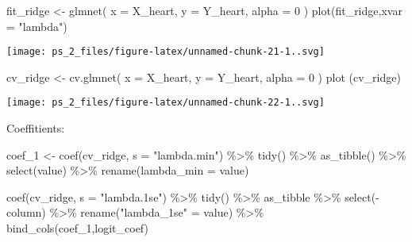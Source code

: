 \documentclass[
]{article}
\newenvironment{Shaded}{\begin{snugshade}}{\end{snugshade}}
\newcommand{\AttributeTok}[1]{\textcolor[rgb]{0.77,0.63,0.00}{#1}}
\newcommand{\DecValTok}[1]{\textcolor[rgb]{0.00,0.00,0.81}{#1}}
\newcommand{\FunctionTok}[1]{\textcolor[rgb]{0.00,0.00,0.00}{#1}}
\newcommand{\NormalTok}[1]{#1}
\newcommand{\OtherTok}[1]{\textcolor[rgb]{0.56,0.35,0.01}{#1}}
\newcommand{\SpecialCharTok}[1]{\textcolor[rgb]{0.00,0.00,0.00}{#1}}
\newcommand{\StringTok}[1]{\textcolor[rgb]{0.31,0.60,0.02}{#1}}
\begin{document}
\begin{Shaded}
\begin{Highlighting}[]
\NormalTok{fit\_ridge }\OtherTok{\textless{}{-}} \FunctionTok{glmnet}\NormalTok{(}
  \AttributeTok{x =}\NormalTok{ X\_heart,}
  \AttributeTok{y =}\NormalTok{ Y\_heart,}
  \AttributeTok{alpha =} \DecValTok{0}
\NormalTok{)}
\FunctionTok{plot}\NormalTok{(fit\_ridge,}\AttributeTok{xvar =} \StringTok{"lambda"}\NormalTok{)}
\end{Highlighting}
\end{Shaded}

\texttt{[image: ps\_2\_files/figure-latex/unnamed-chunk-21-1..svg]}

\begin{Shaded}
\begin{Highlighting}[]
\NormalTok{cv\_ridge }\OtherTok{\textless{}{-}} \FunctionTok{cv.glmnet}\NormalTok{(}
  \AttributeTok{x =}\NormalTok{ X\_heart,}
  \AttributeTok{y =}\NormalTok{ Y\_heart,}
  \AttributeTok{alpha =} \DecValTok{0} 
\NormalTok{)}
\FunctionTok{plot}\NormalTok{ (cv\_ridge)}
\end{Highlighting}
\end{Shaded}

\texttt{[image: ps\_2\_files/figure-latex/unnamed-chunk-22-1..svg]}

Coeffitients:

\begin{Shaded}
\begin{Highlighting}[]
\NormalTok{coef\_1 }\OtherTok{\textless{}{-}} \FunctionTok{coef}\NormalTok{(cv\_ridge, }\AttributeTok{s =} \StringTok{"lambda.min"}\NormalTok{) }\SpecialCharTok{\%\textgreater{}\%}
  \FunctionTok{tidy}\NormalTok{() }\SpecialCharTok{\%\textgreater{}\%}
  \FunctionTok{as\_tibble}\NormalTok{() }\SpecialCharTok{\%\textgreater{}\%}
  \FunctionTok{select}\NormalTok{(value) }\SpecialCharTok{\%\textgreater{}\%}
  \FunctionTok{rename}\NormalTok{(}\AttributeTok{lambda\_min =}\NormalTok{ value)}

\FunctionTok{coef}\NormalTok{(cv\_ridge, }\AttributeTok{s =} \StringTok{"lambda.1se"}\NormalTok{) }\SpecialCharTok{\%\textgreater{}\%}
  \FunctionTok{tidy}\NormalTok{() }\SpecialCharTok{\%\textgreater{}\%}
\NormalTok{  as\_tibble }\SpecialCharTok{\%\textgreater{}\%}
  \FunctionTok{select}\NormalTok{(}\SpecialCharTok{{-}}\NormalTok{column) }\SpecialCharTok{\%\textgreater{}\%} 
  \FunctionTok{rename}\NormalTok{(}\StringTok{"lambda\_1se"} \OtherTok{=}\NormalTok{ value) }\SpecialCharTok{\%\textgreater{}\%} 
  \FunctionTok{bind\_cols}\NormalTok{(coef\_1,logit\_coef)}
\end{Highlighting}
\end{Shaded}
\end{document}
